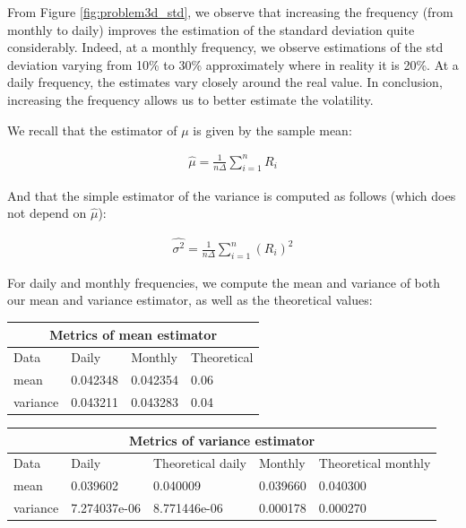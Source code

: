 \documentclass[10pt]{article}
\newenvironment{exercise}[2][Exercise]{\begin{trivlist}
  \item[\hskip \labelsep {\bfseries #1}\hskip \labelsep {\bfseries #2.}]}{\end{trivlist}}
\begin{document}
\begin{exercise}{3}
	\smallbreak
	
	From Figure \ref{fig:problem3d_std}, we observe that increasing the frequency (from monthly to daily) improves the estimation of the standard deviation quite considerably. Indeed, at a monthly frequency, we observe estimations of the std deviation varying from 10\% to 30\% approximately where in reality it is 20\%. At a daily frequency, the estimates vary closely around the real value. In conclusion, increasing the frequency allows us to better estimate the volatility. 
  
	\bigbreak
	
	 We recall that the estimator of $\mu$ is given by the sample mean:
	 
	\begin{align*}
		\hat{\mu} = \frac{1}{n \Delta}\sum^{n}_{i = 1}R_{i}
	\end{align*}
	
	And that the simple estimator of the variance is computed as follows (which does not depend on $\hat{\mu}$):
	
	\begin{align*}
		\hat{\sigma^{2}} = \frac{1}{n \Delta}\sum^{n}_{i = 1}(R_{i})^{2}
	\end{align*}
	 
	 For daily and monthly frequencies, we compute the mean and variance of both our mean and variance estimator, as well as the theoretical values:
	 
	 \bigbreak
	 
	 \begin{tabular}{ |p{3cm}||p{3cm}|p{3cm}|p{3cm}| }
		\hline
	 	\multicolumn{4}{|c|}{Metrics of mean estimator} \\
	 	\hline
	 	Data & Daily & Monthly & Theoretical\\
 		\hline
 		mean  &  0.042348 & 0.042354 & 0.06 \\
 		variance & 0.043211 & 0.043283 & 0.04\\
 		\hline
	\end{tabular}
	
	\bigbreak	
	
	\begin{tabular}{ |p{2cm}||p{2cm}|p{3cm}|p{2cm}|p{3cm}| }
		\hline
	 	\multicolumn{5}{|c|}{Metrics of variance estimator} \\
	 	\hline
	 	Data & Daily & Theoretical daily  & Monthly & Theoretical monthly \\
 		\hline
 		mean  &  0.039602 & 0.040009 & 0.039660 & 0.040300\\
 		variance & 7.274037e-06 & 8.771446e-06 & 0.000178 & 0.000270 \\
 		\hline
	\end{tabular}
	

\end{exercise}
\end{document}

